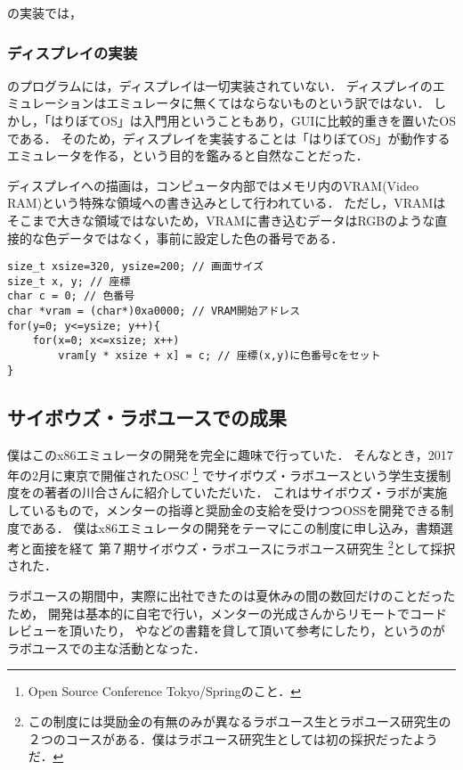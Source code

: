 \documentclass[10pt,a4j]{jsarticle}
\begin{document}
\cite{learn-x86-by-emu}の実装では，

\subsubsection{ディスプレイの実装}
\cite{learn-x86-by-emu}のプログラムには，ディスプレイは一切実装されていない．
ディスプレイのエミュレーションはエミュレータに無くてはならないものという訳ではない．
しかし，「はりぼてOS」は入門用ということもあり，GUIに比較的重きを置いたOSである．
そのため，ディスプレイを実装することは「はりぼてOS」が動作するエミュレータを作る，という目的を鑑みると自然なことだった．

ディスプレイへの描画は，コンピュータ内部ではメモリ内のVRAM(Video RAM)という特殊な領域への書き込みとして行われている．
ただし，VRAMはそこまで大きな領域ではないため，VRAMに書き込むデータはRGBのような直接的な色データではなく，事前に設定した色の番号である．

\begin{lstlisting}
size_t xsize=320, ysize=200; // 画面サイズ
size_t x, y; // 座標
char c = 0; // 色番号
char *vram = (char*)0xa0000; // VRAM開始アドレス
for(y=0; y<=ysize; y++){
	for(x=0; x<=xsize; x++)
		vram[y * xsize + x] = c; // 座標(x,y)に色番号cをセット
}
\end{lstlisting}


\subsection{サイボウズ・ラボユースでの成果}

僕はこのx86エミュレータの開発を完全に趣味で行っていた．
そんなとき，2017年の2月に東京で開催されたOSC
\footnote{Open Source Conference Tokyo/Springのこと．}
でサイボウズ・ラボユースという学生支援制度を\cite{30days-osdev}の著者の川合さんに紹介していただいた．
これはサイボウズ・ラボが実施しているもので，メンターの指導と奨励金の支給を受けつつOSSを開発できる制度である．
僕はx86エミュレータの開発をテーマにこの制度に申し込み，書類選考と面接を経て
第７期サイボウズ・ラボユースにラボユース研究生
\footnote{この制度には奨励金の有無のみが異なるラボユース生とラボユース研究生の２つのコースがある．僕はラボユース研究生としては初の採択だったようだ．}として採択された．

ラボユースの期間中，実際に出社できたのは夏休みの間の数回だけのことだったため，
開発は基本的に自宅で行い，メンターの光成さんからリモートでコードレビューを頂いたり，
\cite{read-486}や\cite{effective-cpp}などの書籍を貸して頂いて参考にしたり，というのがラボユースでの主な活動となった．
\end{document}
